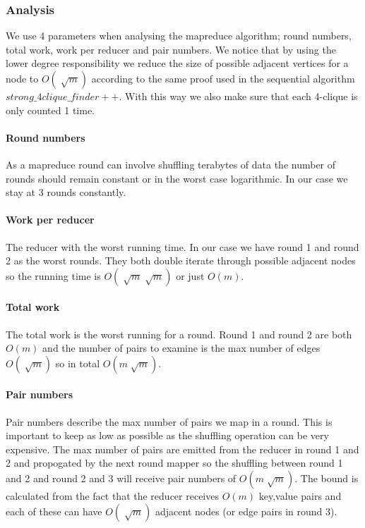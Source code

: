 \documentclass{article}
\begin{document}
\subsubsection{Analysis}
We use 4 parameters when analysing the mapreduce algorithm; round numbers, total work, work per reducer and pair numbers. We notice that by using the lower degree responsibility we reduce the size of possible adjacent vertices for a node to $O(\sqrt[]{m})$ according to the same proof \cite{AlgorithmicAspects} used in the sequential algorithm $strong\_4clique\_finder++$. With this way we also make sure that each 4-clique is only counted 1 time.

\paragraph{Round numbers}
As a mapreduce round can involve shuffling terabytes of data the number of rounds should remain constant or in the worst case logarithmic. In our case we stay at 3 rounds constantly.

\paragraph{Work per reducer}
The reducer with the worst running time. In our case we have round 1 and round 2 as the worst rounds. They both double iterate through possible adjacent nodes so the running time is $O(\sqrt[]{m}\sqrt[]{m})$ or just $O(m)$.

\paragraph{Total work}
The total work is the worst running for a round. Round 1 and round 2 are both $O(m)$ and the number of pairs to examine is the max number of edges $O(\sqrt[]{m})$ so in total $O(m\sqrt[]{m})$.

\paragraph{Pair numbers}
Pair numbers describe the max number of pairs we map in a round. This is important to keep as low as possible as the shuffling operation can be very expensive. The max number of pairs are emitted from the reducer in round 1 and 2 and propogated by the next round mapper so the shuffling between round 1 and 2 and round 2 and 3 will receive pair numbers of $O(m\sqrt[]{m})$. The bound is calculated from the fact that the reducer receives $O(m)$ key,value pairs and each of these can have $O(\sqrt[]{m})$ adjacent nodes (or edge pairs in round 3).
\end{document}

